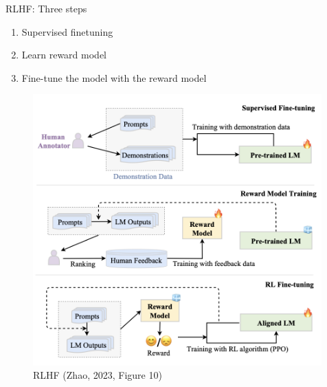 \documentclass[10pt]{beamer}
\begin{document}
\begin{frame}{RLHF: Three steps}

\begin{enumerate}
\item Supervised finetuning %
\item Learn reward model %
\item Fine-tune the model with the reward model
\end{enumerate}

\begin{figure}[h]
\centering
\includegraphics[width=0.99\textwidth]{fig/zhao_2023_fig10}
\caption{RLHF (Zhao, 2023, Figure 10)}
\end{figure}

\end{frame}
\end{document}
